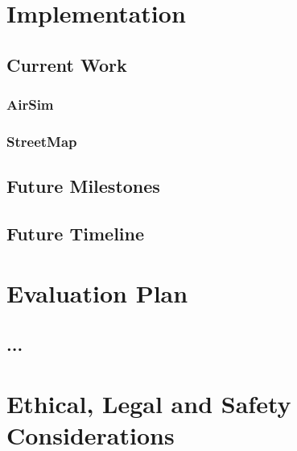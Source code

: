 \documentclass[11pt,oneside]{report}
\begin{document}
\chapter{Implementation}
\section{Current Work}
\subsection{AirSim}
\subsection{StreetMap}
\section{Future Milestones} \label{FuturePlanning}
\pagebreak
\section{Future Timeline}

\pagebreak

\chapter{Evaluation Plan}
\section{...}

\chapter{Ethical, Legal and Safety Considerations}



\newpage
\nocite{*}

\end{document}
